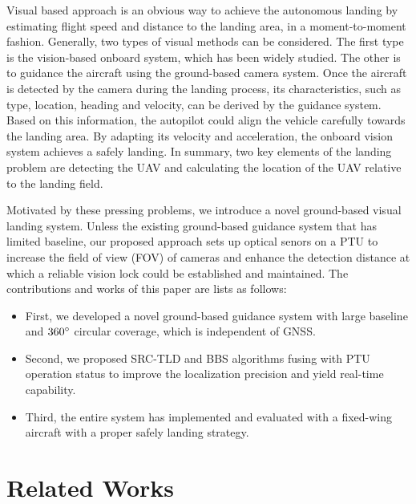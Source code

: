 Visual based approach is an obvious way to achieve the autonomous landing by estimating flight speed and distance to the landing area, in a moment-to-moment fashion. Generally, two types of visual methods can be considered. The first type is the vision-based onboard system, which has been widely studied. The other is to guidance the aircraft using the ground-based camera system. Once the aircraft is detected by the camera during the landing process, its characteristics, such as type, location, heading and velocity, can be derived by the guidance system. Based on this information, the autopilot could align the vehicle carefully towards the landing area. By adapting its velocity and acceleration, the onboard vision system achieves a safely landing. In summary, two key elements of the landing problem are detecting the UAV and calculating the location of the UAV relative to the landing field. 

Motivated by these pressing problems, we introduce a novel ground-based visual landing system. Unless the existing ground-based guidance system that has limited baseline, our proposed approach sets up optical senors on a PTU to increase the field of view (FOV) of cameras and enhance the detection distance at which a reliable vision lock could be established and maintained. The contributions and works of this paper are lists as follows:
\begin{itemize}
	\item First, we developed a novel ground-based guidance system with large baseline and $360\degree$ circular coverage, which is independent of GNSS.
	\item Second, we proposed SRC-TLD and BBS algorithms fusing with PTU operation status to improve the localization precision and yield real-time capability.
	\item Third, the entire system has implemented and evaluated with a fixed-wing aircraft with a proper safely landing strategy.
\end{itemize}

\section{Related Works}

